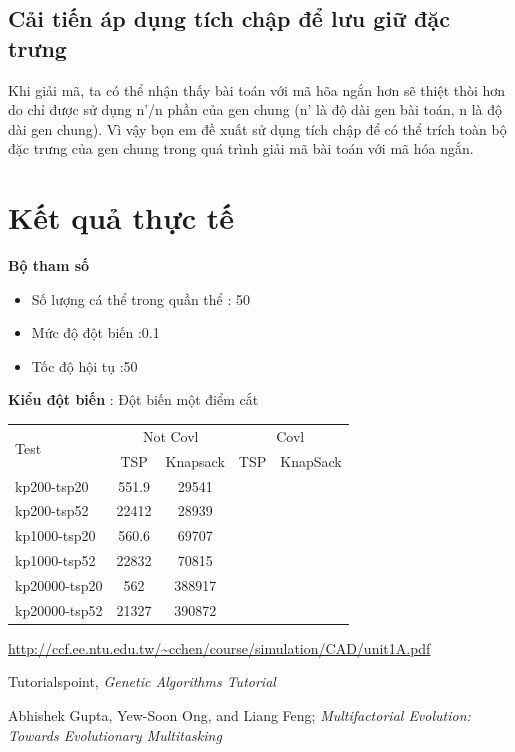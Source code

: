 \documentclass[a4paper,12pt]{report}
\begin{document}
\subsection{Cải tiến áp dụng tích chập để lưu giữ đặc trưng}
Khi giải mã, ta có thể nhận thấy bài toán với mã hõa ngắn hơn sẽ thiệt thòi hơn do chỉ được sử dụng n'/n phần của gen chung (n' là độ dài gen bài toán, n là độ dài gen chung). Vì vậy bọn em đề xuất sử dụng tích chập để có thể trích toàn bộ đặc trưng của gen chung trong quá trình giải mã bài toán với mã hóa ngắn.
\section{Kết quả thực tế}
\textbf{Bộ tham số}
\begin{itemize}
\item Số lượng cá thể trong quần thể : 50
\item Mức độ đột biến :0.1
\item Tốc độ hội tụ :50
\end{itemize}

\textbf{Kiểu đột biến} : Đột biến một điểm cắt


\begin{longtable}{|l |c |c |c |c|}
\hline
\multirow{2}{*}{Test} 
& \multicolumn{2}{c|}{Not Covl} &\multicolumn{2}{|c|}{Covl} \\
\cline{2-5}
&TSP & Knapsack & TSP & KnapSack \\
\hline
kp200-tsp20  & 551.9&29541 & & 
\\ \hline
kp200-tsp52&22412 &28939&& \\ \hline
kp1000-tsp20 &560.6&69707&& \\ \hline
kp1000-tsp52 &22832&70815&& \\ \hline
kp20000-tsp20 &562&388917&& \\ \hline
kp20000-tsp52 &21327&390872&& \\ \hline
\end{longtable}

\begin{thebibliography}{9}
 \url{http://ccf.ee.ntu.edu.tw/~cchen/course/simulation/CAD/unit1A.pdf}

 Tutorialspoint, \textit{Genetic Algorithms Tutorial}

 Abhishek Gupta, Yew-Soon Ong, and Liang Feng; \textit{Multifactorial Evolution: Towards Evolutionary Multitasking}

\end{thebibliography}
\end{document}
